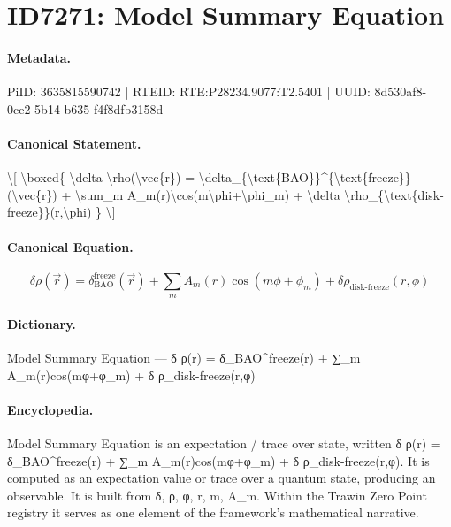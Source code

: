\section*{ID7271: Model Summary Equation}
\paragraph{Metadata.}
PiID: 3635815590742 | RTEID: RTE:P28234.9077:T2.5401 | UUID: 8d530af8-0ce2-5b14-b635-f4f8dfb3158d

\paragraph{Canonical Statement.}
\textbackslash{}[ \textbackslash{}boxed\{ \textbackslash{}delta \textbackslash{}rho(\textbackslash{}vec\{r\}) = \textbackslash{}delta\_\{\textbackslash{}text\{BAO\}\}\textasciicircum{}\{\textbackslash{}text\{freeze\}\}(\textbackslash{}vec\{r\}) + \textbackslash{}sum\_m A\_m(r)\textbackslash{}cos(m\textbackslash{}phi+\textbackslash{}phi\_m) + \textbackslash{}delta \textbackslash{}rho\_\{\textbackslash{}text\{disk-freeze\}\}(r,\textbackslash{}phi) \} \textbackslash{}]

\paragraph{Canonical Equation.}
\[
\boxed{ \delta \rho(\vec{r}) = \delta_{\text{BAO}}^{\text{freeze}}(\vec{r}) + \sum_m A_m(r)\cos(m\phi+\phi_m) + \delta \rho_{\text{disk-freeze}}(r,\phi) }
\]

\paragraph{Dictionary.}
Model Summary Equation — δ ρ(r) = δ\_BAO\textasciicircum{}freeze(r) + ∑\_m A\_m(r)cos(mφ+φ\_m) + δ ρ\_disk-freeze(r,φ)

\paragraph{Encyclopedia.}
Model Summary Equation is an expectation / trace over state, written δ ρ(r) = δ\_BAO\textasciicircum{}freeze(r) + ∑\_m A\_m(r)cos(mφ+φ\_m) + δ ρ\_disk-freeze(r,φ). It is computed as an expectation value or trace over a quantum state, producing an observable. It is built from δ, ρ, φ, r, m, A\_m. Within the Trawin Zero Point registry it serves as one element of the framework's mathematical narrative.
